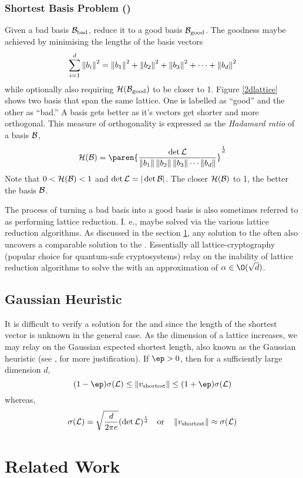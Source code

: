 \documentclass{homework}
\begin{document}
\subsubsection{Shortest Basis Problem (\SBP)} Given a bad basis
$\mathcal{B}_\text{bad}$, reduce it to a good basis $\mathcal{B}_\text{good}$. The
goodness maybe achieved by minimising the lengths of the basis vectors
\eg
\[
  \sum_{i=1}^{d}\left\lVert b_i\right\rVert^2 = \left\lVert b_1\right\rVert^2 + \left\lVert b_2\right\rVert^2 + \left\lVert b_3\right\rVert^2
  + \cdots + \left\lVert b_d\right\rVert^2
\]
while optionally also requiring $\mathcal{H}(\mathcal{B}_\text{good})$ to be
closer to 1. Figure \ref{2dlattice} shows two basis that span the same
lattice. One is labelled as ``good'' and the other as ``bad.'' A basis
gets better as it's vectors get shorter and more orthogonal. This
measure of orthogonality is expressed as the \textit{Hadamard ratio}
of a basis $\mathcal{B}$,
\[
  \mathcal{H}(\B) = \paren{
    \frac{\det \L}{\norm{b_1}\norm{b_2}\norm{b_3}\cdots \norm{b_d}}
  }^\frac{1}{d}
\]
Note that $0 < \mathcal{H}(\mathcal{B}) < 1$ and $\det \mathcal{L} = |\det \mathcal{B}|$. The
closer $\mathcal{H}(\mathcal{B})$ to 1, the better the basis $\mathcal{B}$.

The process of turning a bad basis into a good basis is also sometimes
referred to as performing lattice reduction. I. e., \SBP{} maybe
solved via the various lattice reduction algorithms. As discussed in
the section \ref{rw}, any solution to the \SBP{} often also uncovers a
comparable solution to the \appr\SVP. Essentially all
lattice-cryptography (popular choice for quantum-safe cryptosystems)
relay on the inability of lattice reduction algorithms to solve the
\appr\SVP{} with an approximation of $\alpha \in \O(\sqrt{d})$.

\subsection{Gaussian Heuristic} It is difficult to verify a solution
for the \appr\SVP{} and \SVP{} since the length of the shortest vector
is unknown in the general case. As the dimension of a lattice
increases, we may relay on the Gaussian expected shortest length, also
known as the Gaussian heuristic (see \cite{hoffstein2008introduction},
\cite{siegel1945mean} for more justification). If $\ep > 0$, then for
a sufficiently large dimension $d$,
\[
  (1-\ep)\sigma(\L) \leq
  \norm{v_\text{shortest}}
  \leq (1+\ep)\sigma(\L)
\]
whereas,
\[
  \sigma(\mathcal{L}) = \sqrt{\frac{d}{2\pi e}}(\det \mathcal{L})^\frac{1}{d}
  \quad
  \text{or}
  \quad
  \left\lVert v_\text{shortest}\right\rVert \approx \sigma(\mathcal{L})
\]
\section{Related Work}\label{rw}
\end{document}
